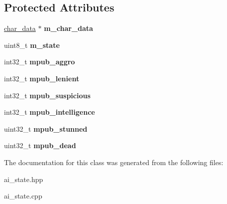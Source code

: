 \subsection*{Protected Attributes}
\begin{DoxyCompactItemize}
\item 
\mbox{\label{classmods_1_1ai__state_a7b28e765d1f1ed2bec5965925d84d022}} 
\hyperlink{structchar__data}{char\+\_\+data} $\ast$ {\bfseries m\+\_\+char\+\_\+data}
\item 
\mbox{\label{classmods_1_1ai__state_a92eb3570093e243e0e3a1d812a5765fc}} 
uint8\+\_\+t {\bfseries m\+\_\+state}
\item 
\mbox{\label{classmods_1_1ai__state_a1eac0a0faaf577d858cddde75c8c4560}} 
int32\+\_\+t {\bfseries mpub\+\_\+aggro}
\item 
\mbox{\label{classmods_1_1ai__state_aa9e06d3e51b914362021ea8fe278efe2}} 
int32\+\_\+t {\bfseries mpub\+\_\+lenient}
\item 
\mbox{\label{classmods_1_1ai__state_aecb13989eaaacd8046e56fd5ed9f94ae}} 
int32\+\_\+t {\bfseries mpub\+\_\+suspicious}
\item 
\mbox{\label{classmods_1_1ai__state_a7bf2149dae325fa03d7c6a05a5967d2d}} 
int32\+\_\+t {\bfseries mpub\+\_\+intelligence}
\item 
\mbox{\label{classmods_1_1ai__state_a957bb5d36a0685e6d2eb6cde6623b5e5}} 
uint32\+\_\+t {\bfseries mpub\+\_\+stunned}
\item 
\mbox{\label{classmods_1_1ai__state_a3faed1a567ce2d83ede56f7616180e3c}} 
uint32\+\_\+t {\bfseries mpub\+\_\+dead}
\end{DoxyCompactItemize}


The documentation for this class was generated from the following files\+:\begin{DoxyCompactItemize}
\item 
ai\+\_\+state.\+hpp\item 
ai\+\_\+state.\+cpp\end{DoxyCompactItemize}
